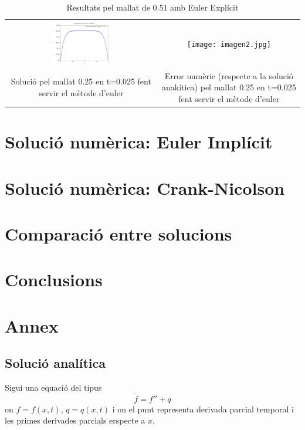 \documentclass{article}
\begin{document}
\begin{table}[h]
    \centering
    \caption{Resultats pel mallat de 0.51 amb Euler Explícit}
    \label{tab:euler_at1}
    \begin{tabular}{cc}
        \includegraphics[width=0.4\textwidth]{images/T_vs_z_at3.png} &
        \texttt{[image: imagen2.jpg]} \\
        
        \parbox{0.4\textwidth}{\centering Solució pel mallat 0.25 en t=0.025 fent servir el mètode d'euler} &
        \parbox{0.4\textwidth}{\centering Error numèric (respecte a la solució anakítica) pel mallat 0.25 en t=0.025 fent servir el mètode d'euler} \\
 
    \end{tabular}
\end{table}

\section{Solució numèrica: Euler Implícit}
\section{Solució numèrica: Crank-Nicolson}
\section{Comparació entre solucions}
\section{Conclusions}
\section{Annex}\label{Annex I}
\subsection{Solució analítica}
Sigui una equació del tipus
\begin{equation*}
    \dot{f} = f'' + q
\end{equation*}
on $f = f(x,t)$, $q =q(x,t)$ i on el punt representa derivada parcial temporal i les primes derivades parcials erspecte a $x$.
\end{document}
